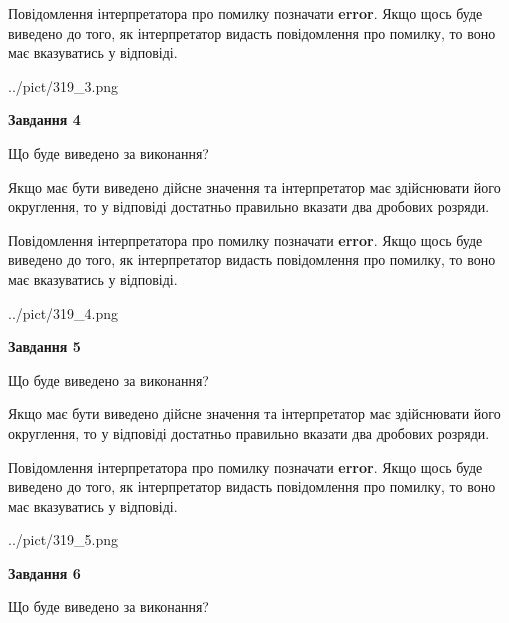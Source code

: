 \documentclass[12pt, ukrainian]{article}
\begin{document}
{\begin {Large}
Повідомлення інтерпретатора про помилку позначати \textbf{error}.
Якщо щось буде виведено до того, як інтерпретатор видасть повідомлення про помилку, 
то воно має вказуватись у відповіді. \par

\begin{center}
	{../pict/319_3.png}
\end{center}
\newpage

{\begin {center}\textbf{Завдання 4}\end {center}}\par
Що буде виведено за виконання? \par

Якщо має бути виведено дійсне значення та інтерпретатор має здійснювати його округлення, 
то у відповіді достатньо правильно вказати два дробових розряди.

Повідомлення інтерпретатора про помилку позначати \textbf{error}.
Якщо щось буде виведено до того, як інтерпретатор видасть повідомлення про помилку, 
то воно має вказуватись у відповіді. \par

\begin{center}
	{../pict/319_4.png}
\end{center}
\newpage

{\begin {center}\textbf{Завдання 5}\end {center}}\par
Що буде виведено за виконання? \par

Якщо має бути виведено дійсне значення та інтерпретатор має здійснювати його округлення, 
то у відповіді достатньо правильно вказати два дробових розряди.

Повідомлення інтерпретатора про помилку позначати \textbf{error}.
Якщо щось буде виведено до того, як інтерпретатор видасть повідомлення про помилку, 
то воно має вказуватись у відповіді. \par

\begin{center}
	{../pict/319_5.png}
\end{center}
\newpage

{\begin {center}\textbf{Завдання 6}\end {center}}\par
Що буде виведено за виконання? \par


\end{Large}}
\end{document}
